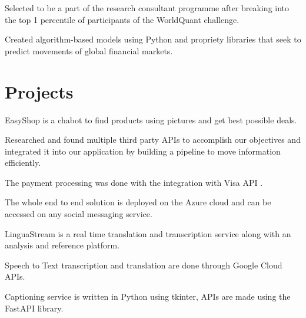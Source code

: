 \documentclass{article}
\begin{document}
\begin{minipage}[t]{0.66\textwidth}
\begin{tightemize}
\item Selected to be a part of the research consultant programme after breaking into the top 1 percentile of participants of the WorldQuant challenge.
\item Created algorithm-based models using Python and propriety libraries that seek to predict movements of global financial markets.
\end{tightemize}
\sectionsep




\section{Projects}
\begin{tightemize}
\item EasyShop is a chabot to find products using pictures and get best possible deals.
\item Researched and found multiple third party APIs to accomplish our objectives and integrated it into our application by building a pipeline to move information efficiently.
\item The payment processing was done with the integration with Visa API .
\item The whole end to end solution is deployed on the Azure cloud and can be accessed on any social messaging service. 
\end{tightemize}
\sectionsep

\begin{tightemize}
\item LinguaStream is a real time translation and transcription service along with an analysis and reference platform.
\item Speech to Text transcription and translation are done through Google Cloud APIs.
\item Captioning service is written in Python using tkinter, APIs are made using the FastAPI library.
\end{tightemize}
\sectionsep


%
%


\end{minipage}%
\end{document}
